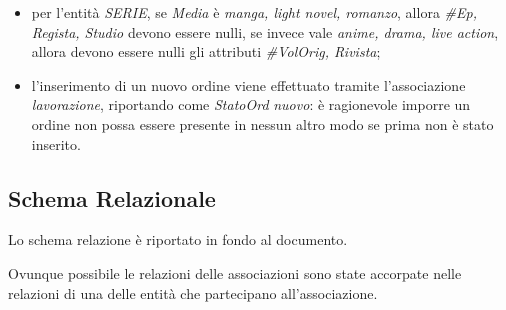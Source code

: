 \documentclass[a4paper]{scrartcl}
\begin{document}
\begin{footnotesize}
\begin{itemize}
\item per l'entità \textit{SERIE}, se \textit{Media} è \textit{manga, light novel, romanzo}, allora \textit{{\#}Ep, Regista, Studio} devono essere nulli, se invece vale \textit{anime, drama, live action}, allora devono essere nulli gli attributi \textit{{\#}VolOrig, Rivista};
\item l'inserimento di un nuovo ordine viene effettuato tramite l'associazione \textit{lavorazione}, riportando come \textit{StatoOrd} \textit{nuovo}: è ragionevole imporre un ordine non possa essere presente in nessun altro modo se prima non è stato inserito.
\end{itemize}

\subsection*{\color[RGB]{155,0,20}Schema Relazionale}
Lo schema relazione è riportato in fondo al documento.

Ovunque possibile le relazioni delle associazioni sono state accorpate nelle relazioni di una delle entità che partecipano all'associazione.


\end{footnotesize}
\end{document}
